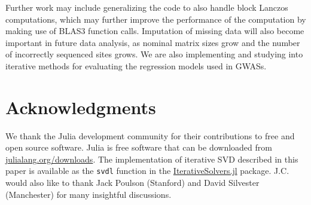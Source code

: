 \documentclass[review]{siamart0516}
\begin{document}
Further work may include generalizing the code to also handle block
Lanczos computations, which may further improve the performance of the
computation by making use of BLAS3 function calls. Imputation of missing
data will also become important in future data analysis, as nominal matrix
sizes grow and the number of incorrectly sequenced sites grows. We are
also implementing and studying into iterative methods for evaluating the
regression models used in GWASs.

\section*{Acknowledgments}

We thank the Julia development community for their contributions to free
and open source software. Julia is free software that can be downloaded
from \url{julialang.org/downloads}. The implementation of iterative SVD
described in this paper is available as the \verb|svdl| function in the
\href{https://github.com/JuliaLang/IterativeSolvers.jl}{IterativeSolvers.jl}
package. J.C. would also like to thank Jack Poulson (Stanford) and David
Silvester
(Manchester) for many insightful discussions.


\end{document}
